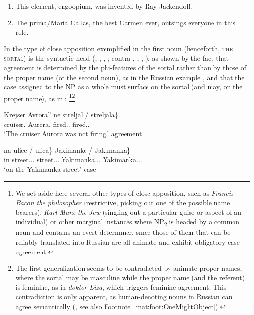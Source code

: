 \documentclass[output=paper,colorlinks,citecolor=brown]{langscibook}
\begin{document}
\ea\label{mat:ex:Jackendoff-Callas}
\renewcommand{\labelenumi}{\alph{enumi}.}
\begin{enumerate}
\item This element, engoopium, was invented by Ray Jackendoff. 
\item The prima/Maria Callas, the best Carmen ever, outsings everyone in this role.
\end{enumerate}
\z

\noindent In the type of close apposition exemplified in  the first noun (henceforth, \textsc{the sortal}) is the syntactic head (\citealt{Jackendoff1984}, \citealt{Lasersohn1986}, \citealt{McCawley1996}, \citeyear{McCawley1998}; contra \citealt{Haugen1953}, \citealt{BurtonRoberts1975}, \citealt{Noailly1991}, \citealt{Keizer2005}), as shown by the fact that agreement is determined by the phi-features of the sortal rather than by those of the proper name (or the second noun), as in the Russian example , and that the case assigned to the NP as a whole must surface on the sortal (and may, on the proper name), as in : \footnote{We set aside here several other types of close apposition, such as \textit{Francis Bacon the philosopher} (restrictive, picking out one of the possible name bearers), \textit{Karl Marx the Jew} (singling out a particular guise or aspect of an individual) or other marginal instances where NP\textsubscript{2} is headed by a common noun and contains an overt determiner, since those of them that can be reliably translated into Russian are all animate and exhibit obligatory case agreement.}\footnote{\label{mat:foot:TheFirstGeneralization}The first generalization seems to be contradicted by animate proper names, where the sortal may be masculine while the proper name (and the referent) is feminine, as in \textit{doktor Liza}, which triggers feminine agreement. This contradiction is only apparent, as human-denoting nouns in Russian can agree semantically (\citealt{Corbett1979}, see also Footnote~\ref{mat:foot:OneMightObject}).} 

\ea\label{mat:ex:krejser-avrora}
\gll Krejser	 Avrora”	ne	\minsp{\{} streljal / \minsp{*} streljala\}. \\
cruiser.{\MASC} {} Aurora.{\FEM}	{\NEG}	{} fired.{\MASC.\SG} {} {} fired.{\FEM.\SG}\\  
\glt `The cruiser Aurora was not firing.' \hfill agreement
\z

\ea\label{mat:ex:ulica-Jakimanka}
\gll na	\minsp{\{} ulice / \minsp{*} ulica\}	\minsp{\{} Jakimanke / Jakimanka\}\\
in	{} street.{\FEM.\SG.\LOC} {} {} street.{\FEM.\SG.\NOM}	{} Yakimanka.{\FEM.\SG.\LOC} {} Yakimanka.{\FEM.\SG.\NOM}\\ 
\glt `on the Yakimanka street' \hfill case
\z
\end{document}
